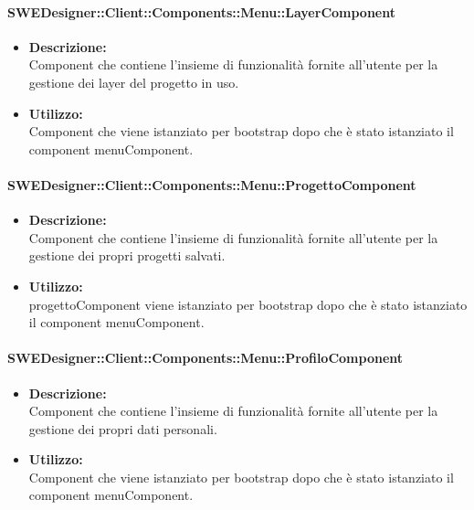 			\paragraph{SWEDesigner::Client::Components::Menu::LayerComponent}
				\begin{itemize}
          			\item \textbf{Descrizione:}\\
          			Component che contiene l’insieme di funzionalità fornite all’utente per la gestione dei layer del progetto in uso.
          			\item \textbf{Utilizzo:}\\
          			Component che viene istanziato per bootstrap dopo che è stato istanziato il component menuComponent.
          		\end{itemize}
			\paragraph{SWEDesigner::Client::Components::Menu::ProgettoComponent}
				\begin{itemize}
          			\item \textbf{Descrizione:}\\
          			Component che contiene l’insieme di funzionalità fornite all’utente per la gestione dei propri progetti salvati.
          			\item \textbf{Utilizzo:}\\
          			progettoComponent viene istanziato per bootstrap dopo che è stato istanziato il component menuComponent.
          		\end{itemize}
			\paragraph{SWEDesigner::Client::Components::Menu::ProfiloComponent}
				\begin{itemize}
          			\item \textbf{Descrizione:}\\
          			Component che contiene l’insieme di funzionalità fornite all’utente per la gestione dei propri dati personali.
          			\item \textbf{Utilizzo:}\\
          			Component che viene istanziato per bootstrap dopo che è stato istanziato il component menuComponent.
          		\end{itemize}
